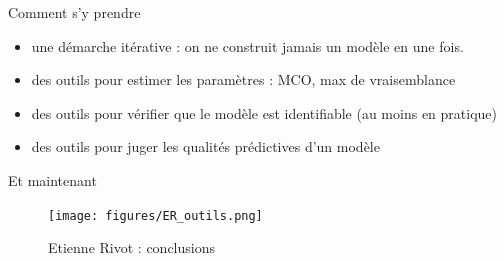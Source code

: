 \documentclass[10pt,ignorenonframetext,]{beamer}
\providecommand{\tightlist}{%
  \setlength{\itemsep}{0pt}\setlength{\parskip}{0pt}}
\begin{document}
\begin{frame}{Comment s'y prendre}

\begin{itemize}
\tightlist
\item
  une démarche itérative : on ne construit jamais un modèle en une fois.
\item
  des outils pour estimer les paramètres : MCO, max de vraisemblance
\item
  des outils pour vérifier que le modèle est identifiable (au moins en
  pratique)
\item
  des outils pour juger les qualités prédictives d'un modèle
\end{itemize}

\end{frame}

\begin{frame}{Et maintenant}

\begin{figure}
\centering
\texttt{[image: figures/ER\_outils.png]}
\caption{Etienne Rivot : conclusions}
\end{figure}

\end{frame}
\end{document}
